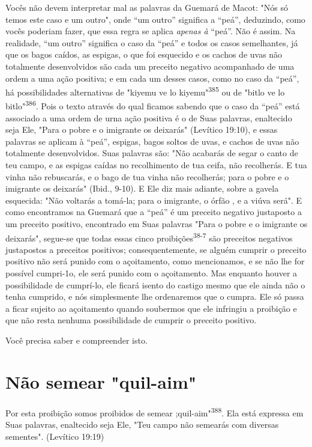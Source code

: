 Vocês não devem interpretar mal as palavras da Guemará de Macot: "Nós só
temos este caso e um outro", onde ``um outro'' significa a ``peá'',
deduzindo, como vocês poderiam fazer, que essa regra se aplica
\emph{apenas à} ``peá''. Não é assim. Na realidade, ``um outro'' significa o
caso da ``peá'' e todos os casos semelhantes, já que os bagos caídos, as
espigas, o que foi es­quecido e os cachos de uvas não totalmente
desenvolvidos são cada um pre­ceito negativo acompanhado de uma ordem a
uma ação positiva; e em cada um desses casos, como no caso da ``peá'', há
possibilidades alternativas de "kiyemu ve lo
kiyemu"\textsuperscript{385} ou de "bitlo ve lo
bitlo"\textsuperscript{386}. Pois o texto através do qual ficamos
sabendo que o caso da ``peá'' está associado a uma ordem de urna ação
positiva é o de Suas palavras, enaltecido seja Ele, "Para o pobre e o
imigrante os deixarás" (Levítico 19:10), e essas palavras se aplicam à
``peá'', espigas, bagos soltos de uvas, e cachos de uvas não totalmente
desenvolvidos. Suas palavras são: "Não acabarás de segar o canto de teu
campo, e as espigas caídas no recolhimento de tua ceifa, não recolherás.
E tua vinha não rebusca­rás, e o bago de tua vinha não recolherás; para
o pobre e o imigrante os deixa­rás" (Ibid., 9-10). E Ele diz mais
adiante, sobre a gavela esquecida: "Não volta­rás a tomá-la; para o
imigrante, o órfão , e a viúva será". E como encontramos na Guemará que
a ``peá'' é um preceito negativo justaposto a um preceito positivo,
encontrado em Suas palavras "Para o pobre e o imigrante os deixa­rás",
segue-se que todas essas cinco proibições\textsuperscript{38-7} são
preceitos negativos jus­tapostos a preceitos positivos;
consequentemente, se alguém cumprir o pre­ceito positivo não será punido
com o açoitamento, como mencionamos, e se não lhe for possível
cumpri-1o, ele será punido com o açoitamento. Mas enquanto houver a
possibilidade de cumprí-lo, ele ficará isento do castigo mesmo que ele
ainda não o tenha cumprido, e nós simplesmente lhe ordena­remos que o
cumpra. Ele só passa a ficar sujeito ao açoitamento quando sou­bermos
que ele infringiu a proibição e que não resta nenhuma possibilidade de
cumprir o preceito positivo.

Você precisa saber e compreender isto.

\section{Não semear "quil-aim"}

Por esta proibição somos proibidos de semear
;quil-aim"\textsuperscript{388}. Ela es­tá expressa em Suas palavras,
enaltecido seja Ele, "Teu campo não semearás com diversas
sementes". (Levítico 19:19)

